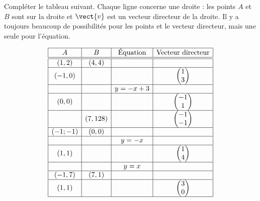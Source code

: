 
\begin{exercice}\label{exosmath-0155}

    Compléter le tableau suivant. Chaque ligne concerne une droite : les points \( A\) et \( B\) sont sur la droite et \( \vect{ v }\) est un vecteur directeur de la droite. Il y a toujours beaucoup de possibilités pour les points et le vecteur directeur, mais une seule pour l'équation.

    \begin{equation*}
        \begin{array}[]{|c|c|c|c|}
            \hline
            A&B&\text{Équation}&\text{Vecteur directeur}\\
            \hline\hline
            (1,2)&(4,4)&&\\
            \hline
            (-1,0)&&&\begin{pmatrix}
                1    \\ 
                3    
            \end{pmatrix}\\
            \hline
            &&y=-x+3&\\
            \hline
            (0,0)&&&\begin{pmatrix}
                -1    \\ 
                1    
            \end{pmatrix}\\
            \hline
            &(7,128)&&\begin{pmatrix}
                -1    \\ 
                -1    
            \end{pmatrix}\\
            \hline
            (-1;-1)&(0,0)&&\\
            \hline
            &&y=-x&\\
            \hline
            (1,1)&&&\begin{pmatrix}
                1    \\ 
                4    
            \end{pmatrix}\\
            \hline
            &&y=x&\\
            \hline
            (-1,7)&(7,1)&&\\
            \hline
            (1,1)&&&\begin{pmatrix}
                3    \\ 
                0    
            \end{pmatrix}\\
            \hline
        \end{array}
    \end{equation*}

\end{exercice}

